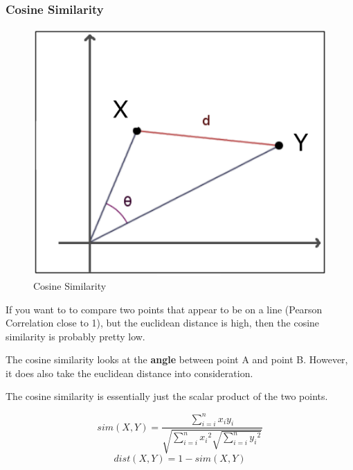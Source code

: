 \documentclass[11pt]{article}
\begin{document}
\subsubsection{Cosine Similarity}

\begin{figure}
    \centering
    \includegraphics[keepaspectratio=true,height=14\baselineskip]{cosine_similarity.png}
    \caption{Cosine Similarity}
    \label{fig:cosine_similarity}
\end{figure}

If you want to to compare two points that appear to be on a line (Pearson Correlation close to 1), but the euclidean distance is high, then the cosine similarity is probably pretty low.

The cosine similarity looks at the \textbf{angle} between point A and point B. However, it does also take the euclidean distance into consideration.

\vspace{10px}

The cosine similarity is essentially just the scalar product of the two points.

\vspace{10px}

\begin{equation} \label{eq:sim}
    sim(X,Y) = \frac{\sum^{n}_{i=i}{x_{i} y_{i}}}{\sqrt{\sum^{n}_{i=i}{x_{i}}^2\sqrt{\sum^{n}_{i=i}{y_{i}}^2}}}
\end{equation}
\begin{equation}
    dist(X,Y) = 1 - sim(X,Y)
\end{equation}
\end{document}
